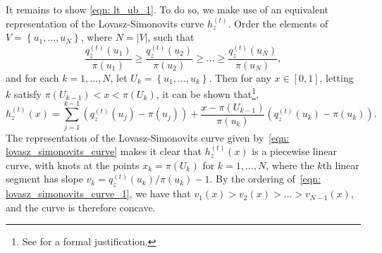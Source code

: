 \documentclass[11pt,twoside]{article}
\newcommand{\set}[1]{\left\{#1\right\}}
\newcommand{\abs}[1]{\left \lvert #1 \right \rvert}
\newcommand{\1}{\mathbf{1}}
\begin{document}
It remains to show \eqref{eqn: lt_ub_1}. To do so, we make use of an equivalent representation of the Lovasz-Simonovits curve $h_z^{(t)}$. Order the elements of $V = \set{u_1, \ldots, u_N}$, where $N = \abs{V}$, such that
\begin{equation}
\label{eqn: lovasz_simonovits_curve_1}
\frac{q_z^{(t)}(u_1)}{\pi(u_1)} \geq \frac{q_z^{(t)}(u_2)}{\pi(u_2)} \geq \ldots \geq \frac{q_z^{(t)}(u_N)}{\pi(u_N)},
\end{equation}
and for each $k = 1,\ldots, N$, let $U_k = \set{u_1, \ldots, u_k}$. Then for any $x \in [0,1]$, letting $k$ satisfy $\pi(U_{k - 1}) < x < \pi(U_k)$, it can be shown that\footnote{See \cite{lovasz1990} for a formal justification.},
\begin{equation}
\label{eqn: lovasz_simonovits_curve}
h_z^{(t)}(x) = \sum_{j = 1}^{k - 1} (q_z^{(t)}(u_j) - \pi(u_j)) + \frac{x - \pi(U_{k - 1})}{\pi(u_k)} \left(q_z^{(t)}(u_k) - \pi(u_k) \right).
\end{equation}
The representation of the Lovasz-Simonovits curve given by~\eqref{eqn: lovasz_simonovits_curve} makes it clear that $h_z^{(t)}(x)$ is a piecewise linear curve, with knots at the points $x_k = \pi(U_k)$ for $k = 1,\ldots,N$, where the $k$th linear segment has slope $v_k = q_z^{(t)}(u_{k})/\pi(u_{k}) - 1$. By the ordering of~\eqref{eqn: lovasz_simonovits_curve_1}, we have that $v_1(x) > v_2(x) > \ldots > v_{N-1}(x)$, and the curve is therefore concave. 
\end{document}
